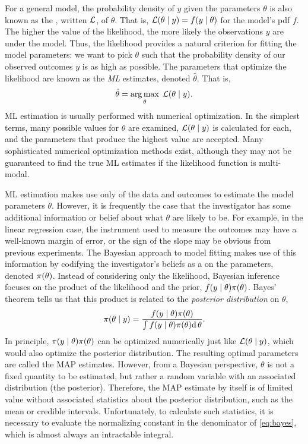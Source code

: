For a general model, the probability density of $y$ given the parameters
$\theta$ is also known as the , written $\mathcal{L}$, of $\theta$.
That is, $\mathcal{L}(\theta \mid y) = f(y \mid \theta)$ for the model's \gls{pdf} $f$.
The higher the value of the likelihood, the more likely the observations $y$
are under the model. Thus, the likelihood provides a natural criterion for
fitting the model parameters: we want to pick $\theta$ such that the
probability density of our observed outcomes $y$ is as high as possible. The
parameters that optimize the likelihood are known as the \textit{\gls{ML}}
estimates, denoted $\hat{\theta}$. That is,
\[
  \hat{\theta} = \operatorname*{arg\,max}_\theta\; \mathcal{L}(\theta \mid y).
\]
\Gls{ML} estimation is usually performed with numerical optimization. In the
simplest terms, many possible values for $\theta$ are examined, $\mathcal{L}(\theta \mid
y)$ is calculated for each, and the parameters that produce the highest value
are accepted. Many sophisticated numerical optimization methods exist, although
they may not be guaranteed to find the true \gls{ML} estimates if the
likelihood function is multi-modal. 

\Gls{ML} estimation makes use only of the data and outcomes to estimate the
model parameters $\theta$. However, it is frequently the case that the
investigator has some additional information or belief about what $\theta$ are
likely to be. For example, in the linear regression case, the instrument used
to measure the outcomes may have a well-known margin of error, or the sign of
the slope may be obvious from previous experiments. The Bayesian approach to
model fitting makes use of this information by codifying the investigator's
beliefs as a  on the parameters, denoted
$\pi(\theta)$. Instead of considering only the likelihood, Bayesian inference
focuses on the product of the likelihood and the prior, $f(y \mid \theta)
\pi(\theta)$. Bayes' theorem tells us that this product is related to the
\textit{posterior distribution} on $\theta$,
\begin{align}
  \pi(\theta \mid y) 
    = \frac{f(y \mid \theta) \pi(\theta)}
           {\int f(y \mid \theta) \pi(\theta) \mathrm{d}\, \theta}.
  \label{eq:bayes}
\end{align}
In principle, $\pi(y \mid \theta) \pi(\theta)$ can be optimized
numerically just like $\mathcal{L}(\theta \mid y)$, which would also optimize the
posterior distribution. The resulting optimal parameters are called the
\gls{MAP} estimates. However, from a Bayesian perspective, $\theta$ is not a
fixed quantity to be estimated, but rather a random variable with an associated
distribution (the posterior). Therefore, the \gls{MAP} estimate by itself is of
limited value without associated statistics about the posterior distribution,
such as the mean or credible intervals. Unfortunately, to calculate such
statistics, it is necessary to evaluate the normalizing constant in the
denominator of \cref{eq:bayes}, which is almost always an intractable integral.


